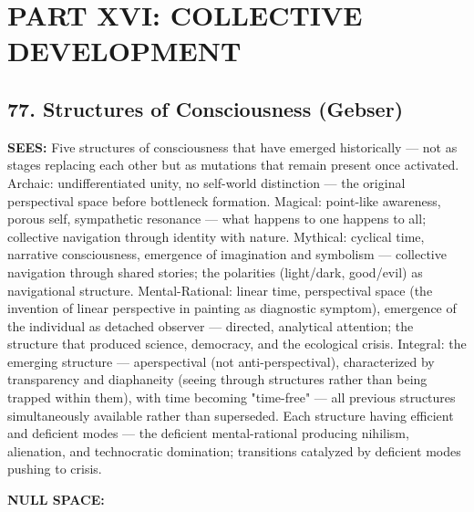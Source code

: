 \section*{PART XVI: COLLECTIVE DEVELOPMENT}


\subsection*{77. Structures of Consciousness (Gebser)}


\textbf{SEES:} Five structures of consciousness that have emerged historically — not as stages replacing each other but as mutations that remain present once activated. Archaic: undifferentiated unity, no self-world distinction — the original perspectival space before bottleneck formation. Magical: point-like awareness, porous self, sympathetic resonance — what happens to one happens to all; collective navigation through identity with nature. Mythical: cyclical time, narrative consciousness, emergence of imagination and symbolism — collective navigation through shared stories; the polarities (light/\allowbreak dark, good/\allowbreak evil) as navigational structure. Mental-Rational: linear time, perspectival space (the invention of linear perspective in painting as diagnostic symptom), emergence of the individual as detached observer — directed, analytical attention; the structure that produced science, democracy, and the ecological crisis. Integral: the emerging structure — aperspectival (not anti-perspectival), characterized by transparency and diaphaneity (seeing through structures rather than being trapped within them), with time becoming "time-free" — all previous structures simultaneously available rather than superseded. Each structure having efficient and deficient modes — the deficient mental-rational producing nihilism, alienation, and technocratic domination; transitions catalyzed by deficient modes pushing to crisis.


\textbf{NULL SPACE:}

